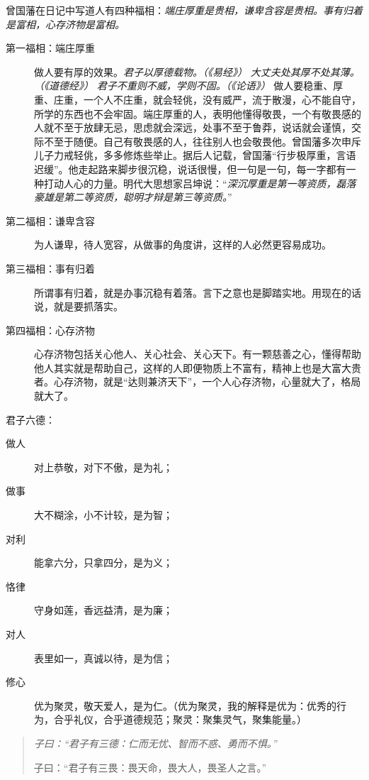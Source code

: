 曾国藩在日记中写道人有四种福相：\textit{端庄厚重是贵相，谦卑含容是贵相。事有归着是富相，心存济物是富相。} \begin{description}
    \item[第一福相：端庄厚重] 做人要有厚的效果。\textit{君子以厚德载物。（《易经》）} \textit{大丈夫处其厚不处其薄。（《道德经》）} \textit{君子不重则不威，学则不固。（《论语》）} 做人要稳重、厚重、庄重，一个人不庄重，就会轻佻，没有威严，流于散漫，心不能自守，所学的东西也不会牢固。端庄厚重的人，表明他懂得敬畏，一个有敬畏感的人就不至于放肆无忌，思虑就会深远，处事不至于鲁莽，说话就会谨慎，交际不至于随便。自己有敬畏感的人，往往别人也会敬畏他。曾国藩多次申斥儿子力戒轻佻，多多修炼些举止。据后人记载，曾国藩“行步极厚重，言语迟缓”。他走起路来脚步很沉稳，说话很慢，但一句是一句，每一字都有一种打动人心的力量。明代大思想家吕坤说：“\textit{深沉厚重是第一等资质，磊落豪雄是第二等资质，聪明才辩是第三等资质。}”
    \item[第二福相：谦卑含容] 为人谦卑，待人宽容，从做事的角度讲，这样的人必然更容易成功。
    \item[第三福相：事有归着] 所谓事有归着，就是办事沉稳有着落。言下之意也是脚踏实地。用现在的话说，就是要抓落实。
    \item[第四福相：心存济物] 心存济物包括关心他人、关心社会、关心天下。有一颗慈善之心，懂得帮助他人其实就是帮助自己，这样的人即便物质上不富有，精神上也是大富大贵者。心存济物，就是“达则兼济天下”，一个人心存济物，心量就大了，格局就大了。
\end{description}

君子六德：\begin{multicols}{2}
    \begin{description}
        \item[做人] 对上恭敬，对下不傲，是为礼；
        \item[做事] 大不糊涂，小不计较，是为智；
        \item[对利] 能拿六分，只拿四分，是为义；
        \item[恪律] 守身如莲，香远益清，是为廉；
        \item[对人] 表里如一，真诚以待，是为信；
        \item[修心] 优为聚灵，敬天爱人，是为仁。（优为聚灵，我的解释是优为：优秀的行为，合乎礼仪，合乎道德规范；聚灵：聚集灵气，聚集能量。）
    \end{description}
\end{multicols}

\begin{quotation}\it
    子曰：“君子有三德：仁而无忧、智而不惑、勇而不惧。”

    子曰：“君子有三畏：畏天命，畏大人，畏圣人之言。”
\end{quotation}

